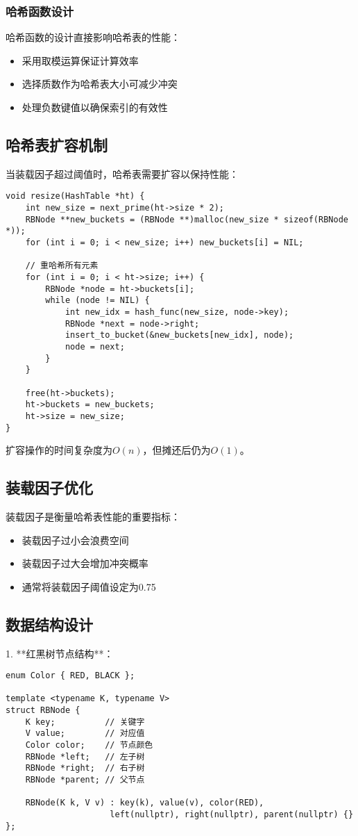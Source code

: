 \documentclass[12pt,a4paper]{article}
\begin{document}
\subsubsection{哈希函数设计}
哈希函数的设计直接影响哈希表的性能：
\begin{itemize}
\item 采用取模运算保证计算效率
\item 选择质数作为哈希表大小可减少冲突
\item 处理负数键值以确保索引的有效性
\end{itemize}

\subsection{哈希表扩容机制}
当装载因子超过阈值时，哈希表需要扩容以保持性能：

\begin{lstlisting}[caption=哈希表扩容实现]
void resize(HashTable *ht) {
    int new_size = next_prime(ht->size * 2);
    RBNode **new_buckets = (RBNode **)malloc(new_size * sizeof(RBNode *));
    for (int i = 0; i < new_size; i++) new_buckets[i] = NIL;
    
    // 重哈希所有元素
    for (int i = 0; i < ht->size; i++) {
        RBNode *node = ht->buckets[i];
        while (node != NIL) {
            int new_idx = hash_func(new_size, node->key);
            RBNode *next = node->right;
            insert_to_bucket(&new_buckets[new_idx], node);
            node = next;
        }
    }
    
    free(ht->buckets);
    ht->buckets = new_buckets;
    ht->size = new_size;
}
\end{lstlisting}

扩容操作的时间复杂度为$O(n)$，但摊还后仍为$O(1)$。

\subsection{装载因子优化}
装载因子是衡量哈希表性能的重要指标：
\begin{itemize}
\item 装载因子过小会浪费空间
\item 装载因子过大会增加冲突概率
\item 通常将装载因子阈值设定为0.75
\end{itemize}
\subsection{数据结构设计}
1. **红黑树节点结构**：
\begin{lstlisting}
enum Color { RED, BLACK };

template <typename K, typename V>
struct RBNode {
    K key;          // 关键字
    V value;        // 对应值
    Color color;    // 节点颜色
    RBNode *left;   // 左子树
    RBNode *right;  // 右子树
    RBNode *parent; // 父节点

    RBNode(K k, V v) : key(k), value(v), color(RED),
                     left(nullptr), right(nullptr), parent(nullptr) {}
};
\end{lstlisting}
\end{document}
